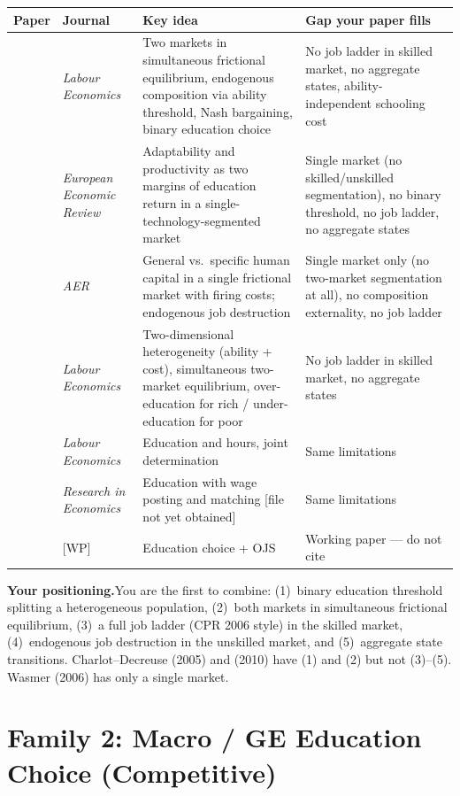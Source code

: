 \documentclass[12pt]{article}
\begin{document}
\begin{longtable}{p{3.8cm} p{3cm} p{3.5cm} p{3.5cm}}
\toprule
\textbf{Paper} & \textbf{Journal} & \textbf{Key idea} & \textbf{Gap your paper fills} \\
\midrule
\endhead
\citet{charlot2005} & \emph{Labour Economics} & Two markets in simultaneous frictional equilibrium, endogenous composition via ability threshold, Nash bargaining, binary education choice & No job ladder in skilled market, no aggregate states, ability-independent schooling cost \\[6pt]
\citet{charlot2005b} & \emph{European Economic Review} & Adaptability and productivity as two margins of education return in a single-technology-segmented market & Single market (no skilled/unskilled segmentation), no binary threshold, no job ladder, no aggregate states \\[6pt]
\citet{wasmer2006} & \emph{AER} & General vs.\ specific human capital in a single frictional market with firing costs; endogenous job destruction & Single market only (no two-market segmentation at all), no composition externality, no job ladder \\[6pt]
\citet{charlot2010} & \emph{Labour Economics} & Two-dimensional heterogeneity (ability + cost), simultaneous two-market equilibrium, over-education for rich / under-education for poor & No job ladder in skilled market, no aggregate states \\[6pt]
\citet{decreuse2013} & \emph{Labour Economics} & Education and hours, joint determination & Same limitations \\[6pt]
\citet{charlot2013} & \emph{Research in Economics} & Education with wage posting and matching [file not yet obtained] & Same limitations \\[6pt]
\citet{agopsowicz2016} & [WP] & Education choice + OJS & Working paper --- do not cite \\
\bottomrule
\end{longtable}

\textbf{Your positioning.}\quad You are the first to combine: (1)~binary education threshold splitting a heterogeneous population, (2)~both markets in simultaneous frictional equilibrium, (3)~a full job ladder (CPR 2006 style) in the skilled market, (4)~endogenous job destruction in the unskilled market, and (5)~aggregate state transitions. Charlot--Decreuse (2005) and (2010) have (1) and (2) but not (3)--(5). Wasmer (2006) has only a single market.


\section{Family 2: Macro / GE Education Choice (Competitive)}
\end{document}
